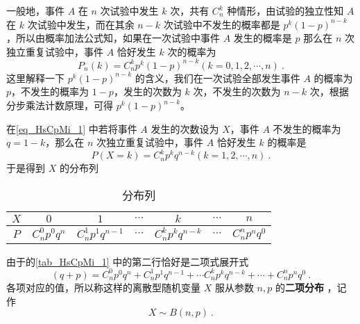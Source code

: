 一般地，事件 $A$ 在 $n$ 次试验中发生 $k$ 次，共有 $C_n^k$ 种情形，由试验的独立性知 $A$ 在 $k$ 次试验中发生，而在其余 $n-k$ 次试验中不发生的概率都是 $p^k(1-p)^{n-k}$，所以由概率加法公式知，如果在一次试验中事件 $A$ 发生的概率是 $p$ 那么在 $n$ 次独立重复试验中，事件 $A$ 恰好发生 $k$ 次的概率为
\begin{equation}\label{eq_HsCpMi_1} 
P_n(k) = C_n^kp^k(1-p)^{n-k}(k=0,1,2,\cdots,n)~.
\end{equation}
这里解释一下 $p^k(1-p)^{n-k}$ 的含义，我们在一次试验全部发生事件 $A$ 的概率为 $p$，不发生的概率为 $1-p$，发生的次数为 $k$ 次，不发生的次数为 $n-k$ 次，根据分步乘法计数原理，可得 $p^k(1-p)^{n-k}$。

在\autoref{eq_HsCpMi_1} 中若将事件 $A$ 发生的次数设为 $X$，事件 $A$ 不发生的概率为 $q = 1 - k$，那么在 $n$ 次独立重复试验中，事件 $A$ 恰好发生 $k$ 的概率是
\begin{equation}
P(X=k) = C_n^kp^kq^{n-k}(k = 1,2,\cdots,n)~.
\end{equation}
于是得到 $X$ 的分布列

\begin{table}[ht]
\centering
\caption{分布列}\label{tab_HsCpMi_1} 
\begin{tabular}{|c|c|c|c|c|c|c|}
\hline
$X$ & $0$ & $1$ & $\cdots$ & $k$ & $\cdots$ & $n$ \\
\hline
$P$ & $C_n^0p^0q^n$ & $C_n^1p^1q^{n-1}$ & $\cdots$ & $C_n^kp^kq^{n-k}$ & $\cdots$ & $C_n^np^nq^0$ \\
\hline
\end{tabular}
\end{table}

由于的\autoref{tab_HsCpMi_1} 中的第二行恰好是二项式展开式
\begin{equation}
(q+p) = C_n^0p^0q^n + C_n^1p^1q^{n-1}+\cdots C_n^kp^kq^{n-k}+\cdots + C_n^np^nq^0~.
\end{equation}
各项对应的值，所以称这样的离散型随机变量 $X$ 服从参数 $n,p$ 的\textbf{二项分布} ，记作
\begin{equation}
X\sim B(n,p)~.
\end{equation}

